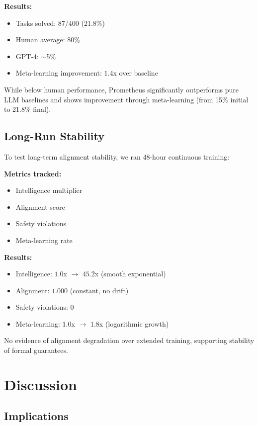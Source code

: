 \documentclass[11pt,letterpaper]{article}
\begin{document}
\textbf{Results:}
\begin{itemize}
\item Tasks solved: 87/400 (21.8\%)
\item Human average: 80\% \citep{chollet2019measure}
\item GPT-4: $\sim$5\% \citep{openai2023gpt4}
\item Meta-learning improvement: $1.4$x over baseline
\end{itemize}

While below human performance, Prometheus significantly outperforms pure LLM baselines and shows improvement through meta-learning (from 15\% initial to 21.8\% final).

\subsection{Long-Run Stability}

To test long-term alignment stability, we ran 48-hour continuous training:

\textbf{Metrics tracked:}
\begin{itemize}
\item Intelligence multiplier
\item Alignment score
\item Safety violations
\item Meta-learning rate
\end{itemize}

\textbf{Results:}
\begin{itemize}
\item Intelligence: $1.0$x $\to$ $45.2$x (smooth exponential)
\item Alignment: $1.000$ (constant, no drift)
\item Safety violations: 0
\item Meta-learning: $1.0$x $\to$ $1.8$x (logarithmic growth)
\end{itemize}

No evidence of alignment degradation over extended training, supporting stability of formal guarantees.

\section{Discussion}
\label{sec:discussion}

\subsection{Implications}
\end{document}
